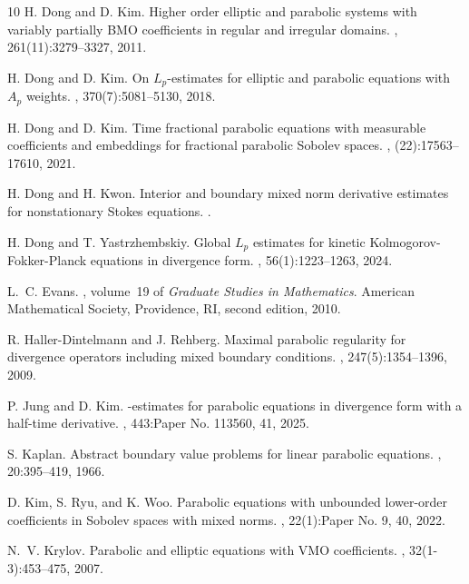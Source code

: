 \documentclass[reqno]{amsart}
\numberwithin{equation}{section}
\theoremstyle{plain}
\theoremstyle{definition}
\begin{document}
\begin{thebibliography}{10}
H. Dong and D. Kim.
\newblock Higher order elliptic and parabolic systems with variably partially
  {BMO} coefficients in regular and irregular domains.
, 261(11):3279--3327, 2011.

H. Dong and D. Kim.
\newblock On {$L_p$}-estimates for elliptic and parabolic equations with
  {$A_p$} weights.
, 370(7):5081--5130, 2018.

H. Dong and D. Kim.
\newblock Time fractional parabolic equations with measurable coefficients and
  embeddings for fractional parabolic {S}obolev spaces.
, (22):17563--17610, 2021.

H. Dong and H. Kwon.
\newblock Interior and boundary mixed norm derivative estimates for
  nonstationary {S}tokes equations.
.

H. Dong and T. Yastrzhembskiy.
\newblock Global {$L_p$} estimates for kinetic {K}olmogorov-{F}okker-{P}lanck
  equations in divergence form.
, 56(1):1223--1263, 2024.

L.~C. Evans.
, volume~19 of {\em Graduate
  Studies in Mathematics}.
\newblock American Mathematical Society, Providence, RI, second edition, 2010.

R. Haller-Dintelmann and J. Rehberg.
\newblock Maximal parabolic regularity for divergence operators including mixed
  boundary conditions.
, 247(5):1354--1396, 2009.

P. Jung and D. Kim.
-estimates for parabolic equations in divergence form with a
  half-time derivative.
, 443:Paper No. 113560, 41, 2025.

S. Kaplan.
\newblock Abstract boundary value problems for linear parabolic equations.
, 20:395--419, 1966.

D. Kim, S. Ryu, and K. Woo.
\newblock Parabolic equations with unbounded lower-order coefficients in
  {S}obolev spaces with mixed norms.
, 22(1):Paper No. 9, 40, 2022.

N.~V. Krylov.
\newblock Parabolic and elliptic equations with {VMO} coefficients.
, 32(1-3):453--475, 2007.


\end{thebibliography}
\end{document}
